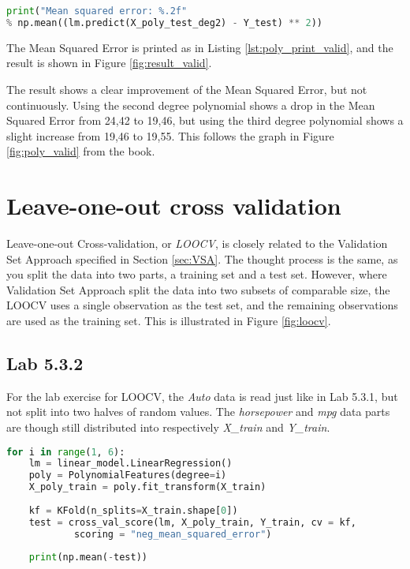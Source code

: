 \begin{lstlisting}[language=Python, label=lst:poly_print_valid, caption=Printing polynomial features with degree = 2]
print("Mean squared error: %.2f" 
% np.mean((lm.predict(X_poly_test_deg2) - Y_test) ** 2))
\end{lstlisting}

The Mean Squared Error is printed as in Listing \ref{lst:poly_print_valid}, and the result is shown in Figure \ref{fig:result_valid}.


The result shows a clear improvement of the Mean Squared Error, but not continuously. Using the second degree polynomial shows a drop in the Mean Squared Error from 24,42 to 19,46, but using the third degree polynomial shows a slight increase from 19,46 to 19,55. This follows the graph in Figure \ref{fig:poly_valid} from the book. 

 


\section{Leave-one-out cross validation}
Leave-one-out Cross-validation, or \emph{LOOCV}, is closely related to the Validation Set Approach specified in Section \ref{sec:VSA}. The thought process is the same, as you split the data into two parts, a training set and a test set. However, where Validation Set Approach split the data into two subsets of comparable size, the LOOCV uses a single observation as the test set, and the remaining observations are used as the training set. This is illustrated in Figure \ref{fig:loocv}. 


\subsection{Lab 5.3.2}
For the lab exercise for LOOCV, the \emph{Auto} data is read just like in Lab 5.3.1, but not split into two halves of random values. The \emph{horsepower} and \emph{mpg} data parts are though still distributed into respectively \emph{X\_train} and \emph{Y\_train}.

\begin{lstlisting}[language=Python, label=lst:LOOCV, caption=Leave-one-out Cross-validation loop]
for i in range(1, 6):
	lm = linear_model.LinearRegression()
	poly = PolynomialFeatures(degree=i)
	X_poly_train = poly.fit_transform(X_train)
	
	kf = KFold(n_splits=X_train.shape[0]) 
	test = cross_val_score(lm, X_poly_train, Y_train, cv = kf, 
			scoring = "neg_mean_squared_error")
	
	print(np.mean(-test))
\end{lstlisting}

